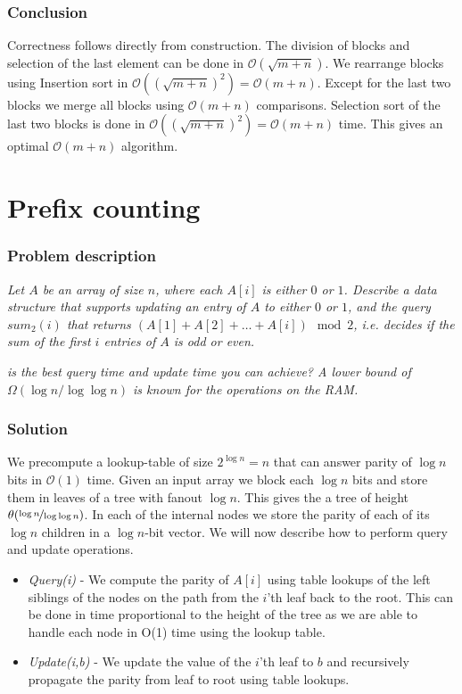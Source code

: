 \documentclass[a4paper,oneside,article,11pt]{memoir}
\begin{document}
\subsection{Conclusion}
Correctness follows directly from construction. The division of blocks and selection of the last element can be done in $\mathcal{O}(\sqrt{m+n})$. We rearrange blocks using Insertion sort in $\mathcal{O}((\sqrt{m+n})^2) = \mathcal{O}(m+n)$. Except for the last two blocks we merge all blocks using $\mathcal{O}(m+n)$ comparisons. Selection sort of the last two blocks is done in $\mathcal{O}((\sqrt{m+n})^2) = \mathcal{O}(m+n)$ time. This gives an optimal $\mathcal{O}(m+n)$ algorithm.

\chapter{Prefix counting}
\label{chp:prefix}
\subsection{Problem description}
\textit{Let $A$ be an array of size $n$, where each $A\left[i\right]$ is either $0$ or $1$. Describe a data structure that supports updating an entry of $A$ to either $0$ or $1$, and the query $sum_2\left(i\right)$ that returns $\left(A\left[1\right]+A\left[2\right]+\dots+A\left[i\right]\right) \mod 2$, i.e. decides if the sum of the first $i$ entries of $A$ is odd or even.}

\textit{ is the best query time and update time you can achieve? A lower bound of $\Omega(\log n/\log\log n)$ is known for the operations on the RAM.}

\subsection{Solution}
We precompute a lookup-table of size $2^{\log n} = n$ that can answer parity of $\log n$ bits in $\mathcal{O}(1)$ time. Given an input array we block each $\log n$ bits and store them in leaves of a tree with fanout $\log n$. This gives the a tree of height $\theta(\nicefrac{\log n}{\log \log n})$. In each of the internal nodes we store the parity of each of its $\log n$ children in a $\log n$-bit vector. We will now describe how to perform query and update operations.

\begin{itemize}
	\item{\textit{Query(i)} - We compute the parity of $A[i]$ using table lookups of the left siblings of the nodes on the path from the $i$'th leaf back to the root. This can be done in time proportional to the height of the tree as we are able to handle each node in O(1) time using the lookup table.}
	\item{\textit{Update(i,b)} - We update the value of the $i$'th leaf to $b$ and recursively propagate the parity from leaf to root using table lookups. }
\end{itemize}
\end{document}
